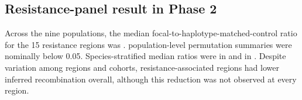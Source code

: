 \subsection*{Resistance-panel result in Phase 2}

Across the nine populations, the median focal-to-haplotype-matched-control ratio for the 15 resistance regions was \PhaseTwoResistanceRatio{}. \PhaseTwoResistanceSignificantCount{} population-level permutation summaries were nominally below 0.05. Species-stratified median ratios were \PhaseTwoGambiaeResistanceRatio{} in \Agambiae and \PhaseTwoColuzziiResistanceRatio{} in \Acoluzzii. Despite variation among regions and cohorts, resistance-associated regions had lower inferred recombination overall, although this reduction was not observed at every region.
